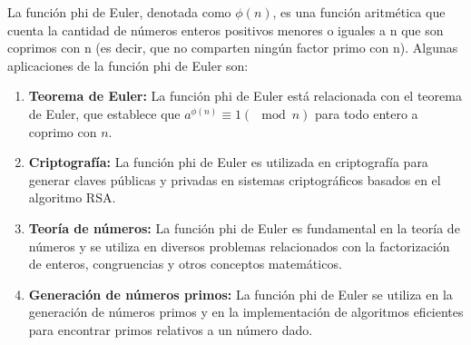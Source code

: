 La función phi de Euler, denotada como $\phi(n)$, es una función aritmética que cuenta la cantidad de números enteros positivos menores o iguales a n que son coprimos con n (es decir, que no comparten ningún factor primo con n). Algunas aplicaciones de la función phi de Euler son:

\begin{enumerate}
	\item \textbf{Teorema de Euler:} La función phi de Euler está relacionada con el teorema de Euler, que establece que $a^{\phi(n)} \equiv 1 (\mod n)$ para todo entero a coprimo con $n$.
	
	\item \textbf{Criptografía:} La función phi de Euler es utilizada en criptografía para generar claves públicas y privadas en sistemas criptográficos basados en el algoritmo RSA.
	
	\item \textbf{Teoría de números:} La función phi de Euler es fundamental en la teoría de números y se utiliza en diversos problemas relacionados con la factorización de enteros, congruencias y otros conceptos matemáticos.
	
	\item \textbf{Generación de números primos:} La función phi de Euler se utiliza en la generación de números primos y en la implementación de algoritmos eficientes para encontrar primos relativos a un número dado.
	
\end{enumerate}


